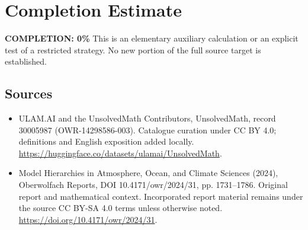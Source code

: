 \documentclass[11pt]{article}
\begin{document}
\section{Completion Estimate}
\noindent\textbf{COMPLETION: 0\%}
This is an elementary auxiliary calculation or an explicit test of a restricted strategy. No new portion of the full source target is established.

\subsection{Sources}
\begin{itemize}
\item[\hypertarget{source:30005987:1}{S1}] ULAM.AI and the UnsolvedMath Contributors, UnsolvedMath, record 30005987 (OWR-14298586-003). Catalogue curation under CC BY 4.0; definitions and English exposition added locally.
\url{https://huggingface.co/datasets/ulamai/UnsolvedMath}.
\item[\hypertarget{source:30005987:2}{S2}] Model Hierarchies in Atmosphere, Ocean, and Climate Sciences (2024), Oberwolfach Reports, DOI 10.4171/owr/2024/31, pp. 1731--1786. Original report and mathematical context. Incorporated report material remains under the source CC BY-SA 4.0 terms unless otherwise noted.
\url{https://doi.org/10.4171/owr/2024/31}.
\end{itemize}
\label{end:30005987}
\end{document}
